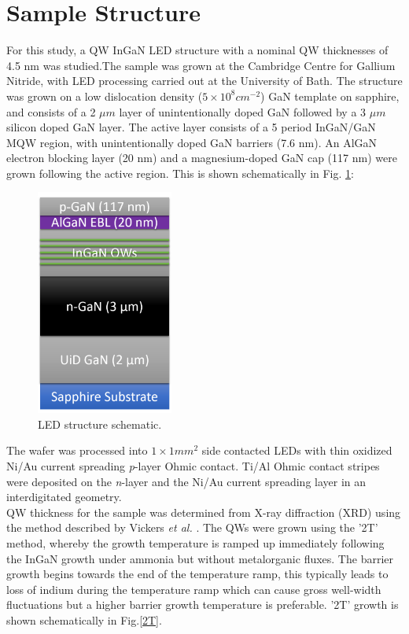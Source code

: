 \section{Sample Structure}
For this study, a QW InGaN LED structure with a nominal QW thicknesses of 4.5 nm was studied.The sample was grown at the Cambridge Centre for Gallium Nitride, with LED processing carried out at the University of Bath. The structure was grown on a low dislocation density  ($5 \times 10^{8}cm^{-2}$) GaN template on sapphire, and consists of a 2 $\mu m$ layer of unintentionally doped GaN followed by a 3 $\mu m$ silicon doped GaN layer. The active layer consists of a 5 period InGaN/GaN MQW region, with unintentionally doped GaN barriers (7.6 nm). An AlGaN electron blocking layer  (20 nm) and a magnesium-doped GaN cap (117 nm) were grown following the active region. This is shown schematically in Fig. \ref{LEDstruct}:

\begin{figure}[!ht]
	\centering
	\includegraphics[width=0.4\textwidth]{Figs/Ch3/LEDstruct}
	\caption[h] {LED structure schematic.}
	\label{LEDstruct}
\end{figure}

\FloatBarrier 
The wafer was processed into $1 \times 1 mm^{2}$ side contacted LEDs with thin oxidized Ni/Au current spreading {\it p}-layer Ohmic contact. Ti/Al Ohmic contact stripes were deposited on the {\it n}-layer and the Ni/Au current spreading layer in an interdigitated geometry.\\
QW thickness for the sample was determined from X-ray diffraction  (XRD) using the method described by Vickers {\it et al.} \cite{Vickers2003}. The QWs were grown using the '2T' method, whereby the growth temperature is ramped up immediately following the InGaN growth under ammonia but without metalorganic fluxes. The barrier growth begins towards the end of the temperature ramp, this typically leads to loss of indium during the temperature ramp which can cause gross well-width fluctuations \cite{Laak2013} but a higher barrier growth temperature is preferable\cite{Oliver2013}. '2T' growth is shown schematically in Fig.\ref{2T}.

